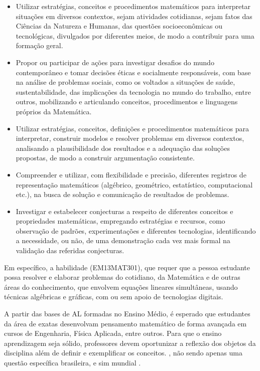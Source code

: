 \begin{itemize}
	\item Utilizar estratégias, conceitos e procedimentos matemáticos para interpretar situações em diversos contextos, sejam atividades cotidianas, sejam fatos das Ciências da Natureza e Humanas, das questões socioeconômicas ou tecnológicas, divulgados por diferentes meios, de modo a contribuir para uma formação geral.
	\item Propor ou participar de ações para investigar desafios do mundo contemporâneo e tomar decisões éticas e socialmente responsáveis, com base na análise de problemas sociais, como os voltados a situações de saúde, sustentabilidade, das implicações da tecnologia no mundo do trabalho, entre outros, mobilizando e articulando conceitos, procedimentos e linguagens próprios da Matemática.
	\item Utilizar estratégias, conceitos, definições e procedimentos matemáticos para interpretar, construir modelos e resolver problemas em diversos contextos, analisando a plausibilidade dos resultados e a adequação das soluções propostas, de modo a construir argumentação consistente.
	\item Compreender e utilizar, com flexibilidade e precisão, diferentes registros de representação matemáticos (algébrico, geométrico, estatístico, computacional etc.), na busca de solução e comunicação de resultados de problemas.
	\item Investigar e estabelecer conjecturas a respeito de diferentes conceitos e propriedades matemáticas, empregando estratégias e recursos, como observação de padrões, experimentações e diferentes tecnologias, identificando a necessidade, ou não, de uma demonstração cada vez mais formal na validação das referidas conjecturas.
\end{itemize}

Em específico, a habilidade (EM13MAT301), que requer que a pessoa estudante possa resolver e elaborar problemas do cotidiano, da Matemática e de outras áreas do conhecimento, que envolvem equações lineares simultâneas, usando técnicas algébricas e gráficas, com ou sem apoio de tecnologias digitais.

A partir das bases de AL formadas no Ensino Médio, é esperado que estudantes da área de exatas desenvolvam pensamento matemático de forma avançada em cursos de Engenharia, Física Aplicada, entre outros. Para que o ensino aprendizagem seja sólido, professores devem oportunizar a reflexão dos objetos da disciplina além de definir e exemplificar os conceitos. \cite{marins_savioli_2016}, não sendo apenas uma questão específica brasileira, e sim mundial \cite{pena2016}.

